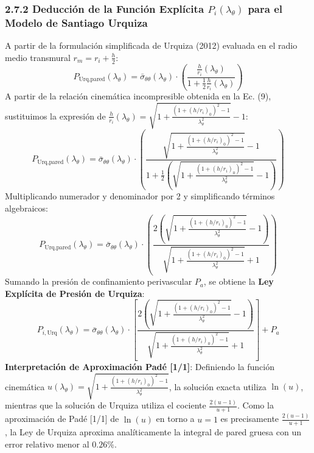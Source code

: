 \documentclass[10pt,a4paper]{article}
\begin{document}
\subsubsection{2.7.2 Deducción de la Función Explícita $P_i(\lambda_\theta)$ para el Modelo de Santiago Urquiza}
A partir de la formulación simplificada de Urquiza (2012) evaluada en el radio medio transmural $r_m = r_i + \frac{h}{2}$:
\begin{equation}
P_{\text{Urq},\text{pared}}(\lambda_\theta) = \bar{\sigma}_{\theta\theta}(\lambda_\theta) \cdot \left( \frac{\frac{h}{r_i}(\lambda_\theta)}{1 + \frac{1}{2}\frac{h}{r_i}(\lambda_\theta)} \right)
\end{equation}
A partir de la relación cinemática incompresible obtenida en la Ec. (9), sustituimos la expresión de $\frac{h}{r_i}(\lambda_\theta) = \sqrt{1 + \frac{\left(1+(h/r_i)_0\right)^2-1}{\lambda_\theta^2}} - 1$:
\begin{equation}
P_{\text{Urq},\text{pared}}(\lambda_\theta) = \bar{\sigma}_{\theta\theta}(\lambda_\theta) \cdot \left( \frac{\sqrt{1 + \frac{\left(1+(h/r_i)_0\right)^2-1}{\lambda_\theta^2}} - 1}{1 + \frac{1}{2}\left(\sqrt{1 + \frac{\left(1+(h/r_i)_0\right)^2-1}{\lambda_\theta^2}} - 1\right)} \right)
\end{equation}
Multiplicando numerador y denominador por 2 y simplificando términos algebraicos:
\begin{equation}
P_{\text{Urq},\text{pared}}(\lambda_\theta) = \bar{\sigma}_{\theta\theta}(\lambda_\theta) \cdot \left( \frac{2\left(\sqrt{1 + \frac{\left(1+(h/r_i)_0\right)^2-1}{\lambda_\theta^2}} - 1\right)}{\sqrt{1 + \frac{\left(1+(h/r_i)_0\right)^2-1}{\lambda_\theta^2}} + 1} \right)
\end{equation}
Sumando la presión de confinamiento perivascular $P_a$, se obtiene la \textbf{Ley Explícita de Presión de Urquiza}:
\begin{equation}
P_{i,\text{Urq}}(\lambda_\theta) = \bar{\sigma}_{\theta\theta}(\lambda_\theta) \cdot \left[ \frac{2\left(\sqrt{1 + \frac{\left(1+(h/r_i)_0\right)^2-1}{\lambda_\theta^2}} - 1\right)}{\sqrt{1 + \frac{\left(1+(h/r_i)_0\right)^2-1}{\lambda_\theta^2}} + 1} \right] + P_a
\end{equation}
\textbf{Interpretación de Aproximación Padé [1/1]}: Definiendo la función cinemática $u(\lambda_\theta) = \sqrt{1 + \frac{\left(1+(h/r_i)_0\right)^2-1}{\lambda_\theta^2}}$, la solución exacta utiliza $\ln(u)$, mientras que la solución de Urquiza utiliza el cociente $\frac{2(u-1)}{u+1}$. Como la aproximación de Padé [1/1] de $\ln(u)$ en torno a $u = 1$ es precisamente $\frac{2(u-1)}{u+1}$, la Ley de Urquiza aproxima analíticamente la integral de pared gruesa con un error relativo menor al $0.26\%$.
\end{document}

